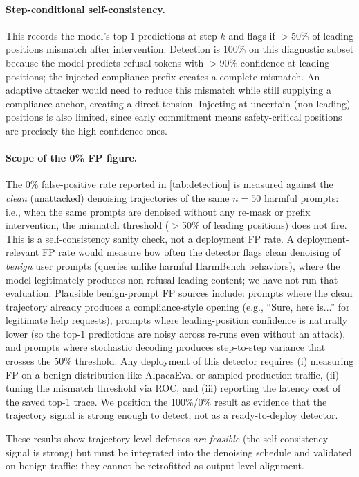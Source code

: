 \documentclass{article}
\theoremstyle{coloredthm}
\begin{document}
\paragraph{Step-conditional self-consistency.} This records the model's top-1 predictions at step $k$ and flags if $>$50\% of leading positions mismatch after intervention. Detection is 100\% on this diagnostic subset because the model predicts refusal tokens with $>$90\% confidence at leading positions; the injected compliance prefix creates a complete mismatch. An adaptive attacker would need to reduce this mismatch while still supplying a compliance anchor, creating a direct tension. Injecting at uncertain (non-leading) positions is also limited, since early commitment means safety-critical positions are precisely the high-confidence ones.

\paragraph{Scope of the 0\% FP figure.} The 0\% false-positive rate reported in \cref{tab:detection} is measured against the \emph{clean} (unattacked) denoising trajectories of the same $n{=}50$ harmful prompts: i.e., when the same prompts are denoised without any re-mask or prefix intervention, the mismatch threshold ($>$50\% of leading positions) does not fire. This is a self-consistency sanity check, not a deployment FP rate. A deployment-relevant FP rate would measure how often the detector flags clean denoising of \emph{benign} user prompts (queries unlike harmful HarmBench behaviors), where the model legitimately produces non-refusal leading content; we have not run that evaluation. Plausible benign-prompt FP sources include: prompts where the clean trajectory already produces a compliance-style opening (e.g., ``Sure, here is...'' for legitimate help requests), prompts where leading-position confidence is naturally lower (so the top-1 predictions are noisy across re-runs even without an attack), and prompts where stochastic decoding produces step-to-step variance that crosses the 50\% threshold. Any deployment of this detector requires (i) measuring FP on a benign distribution like AlpacaEval or sampled production traffic, (ii) tuning the mismatch threshold via ROC, and (iii) reporting the latency cost of the saved top-1 trace. We position the 100\%/0\% result as evidence that the trajectory signal is strong enough to detect, not as a ready-to-deploy detector.

These results show trajectory-level defenses \textit{are feasible} (the self-consistency signal is strong) but must be integrated into the denoising schedule and validated on benign traffic; they cannot be retrofitted as output-level alignment.
\end{document}
